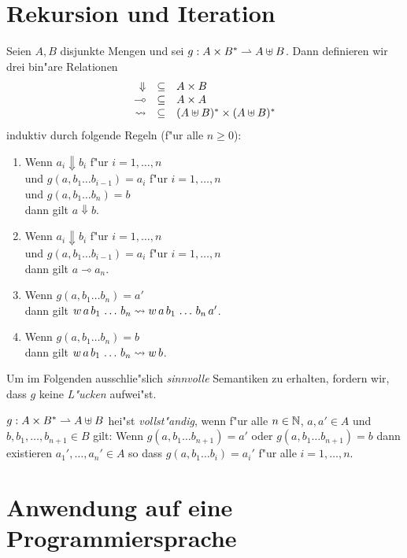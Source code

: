 \documentclass[12pt,a4paper]{article}
\begin{document}
\section{Rekursion und Iteration}

Seien $A,B$ disjunkte Mengen und sei $g: A \times B^* \rightharpoonup A \uplus B$. Dann definieren wir
drei bin"are Relationen
\[\begin{array}{rcl}
  \Downarrow & \subseteq & A \times B \\
  \multimap  & \subseteq & A \times A \\
  \rightsquigarrow      & \subseteq & (A \uplus B)^* \times (A \uplus B)^*
\end{array}\]
induktiv durch folgende Regeln (f"ur alle $n \ge 0$):
\begin{enumerate}
\item Wenn $a_i \Downarrow b_i$ f"ur $i=1,\ldots,n$ \\
  und $g(a,b_1 \ldots b_{i-1}) = a_i$ f"ur $i = 1,\ldots,n$ \\
  und $g(a,b_1 \ldots b_n) = b$ \\
  dann gilt $a \Downarrow b$.
\item Wenn $a_i \Downarrow b_i$ f"ur $i=1,\ldots,n$ \\
  und $g(a,b_1 \ldots b_{i-1})=a_i$ f"ur $i=1,\ldots,n$ \\
  dann gilt $a \multimap a_n$.
\item Wenn $g(a,b_1 \ldots b_n) = a'$ \\
  dann gilt $w\,a\,b_1\,\ldots\,b_n \rightsquigarrow w\,a\,b_1\,\ldots\,b_n\,a'$.
\item Wenn $g(a,b_1 \ldots b_n) = b$ \\
  dann gilt $w\,a\,b_1\,\ldots\,b_n \rightsquigarrow w\,b$.
\end{enumerate}
Um im Folgenden ausschlie"slich \emph{sinnvolle} Semantiken zu erhalten, fordern wir, dass $g$
keine \emph{L"ucken} aufwei"st.
\begin{definition}
  $g: A \times B^* \rightharpoonup A \uplus B$ hei"st \emph{vollst"andig}, wenn f"ur alle $n \in \mathbb N$, $a,a'\in A$
  und $b,b_1,\ldots,b_{n+1} \in B$ gilt: 
  Wenn $g(a,b_1 \ldots b_{n+1}) = a'$ oder $g(a,b_1 \ldots b_{n+1}) = b$ dann
  existieren $a_1',\ldots,a_n' \in A$ so dass $g(a,b_1 \ldots b_i) = a_i'$ f"ur alle $i = 1,\ldots,n$.
\end{definition}


\section{Anwendung auf eine Programmiersprache}
\end{document}
